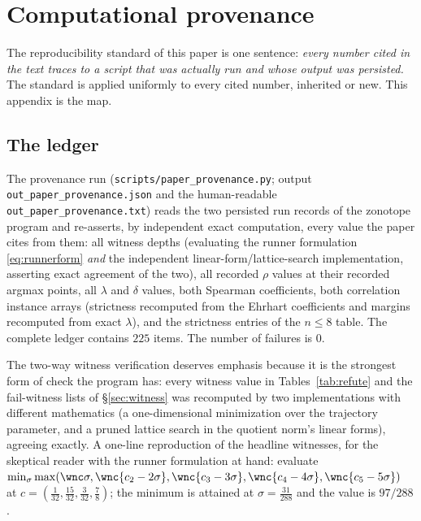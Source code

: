 
\section{Computational provenance}\label{sec:prov}

The reproducibility standard of this paper is one sentence:
\emph{every number cited in the text traces to a script that was
actually run and whose output was persisted.} The standard is applied
uniformly to every cited number, inherited or new. This appendix is
the map.

\subsection{The ledger}

The provenance run (\texttt{scripts/paper\_provenance.py}; output
\texttt{out\_paper\_provenance.json} and the human-readable
\texttt{out\_paper\_provenance.txt}) reads the two persisted run records
of the zonotope program and re-asserts, by independent exact
computation, every value the paper cites from them: all witness depths
(evaluating the runner formulation \eqref{eq:runnerform} \emph{and} the
independent linear-form/lattice-search implementation, asserting exact
agreement of the two), all recorded $\rho$ values at their recorded
argmax points, all $\lambda$ and $\delta$ values, both Spearman
coefficients, both correlation instance arrays (strictness recomputed
from the Ehrhart coefficients and margins recomputed from exact
$\lambda$), and the strictness entries of the $n\le8$ table. The
complete ledger contains $225$ items. The number of failures is $0$.

The two-way witness verification deserves emphasis because it is the
strongest form of check the program has: every witness value in
Tables~\ref{tab:refute} and the fail-witness lists of
\S\ref{sec:witness} was recomputed by two implementations with different
mathematics (a one-dimensional minimization over the trajectory
parameter, and a pruned lattice search in the quotient norm's linear
forms), agreeing exactly. A one-line reproduction of the headline
witnesses, for the skeptical reader with the runner formulation at
hand: evaluate
$\min_\sigma\max(\wnc\sigma,\wnc{c_2-2\sigma},\wnc{c_3-3\sigma},
\wnc{c_4-4\sigma},\wnc{c_5-5\sigma})$ at
$c=(\tfrac1{32},\tfrac{15}{32},\tfrac3{32},\tfrac78)$; the minimum is
attained at $\sigma=\tfrac{31}{288}$ and the value is $97/288$.

